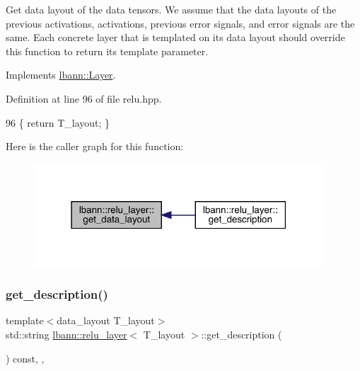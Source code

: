 Get data layout of the data tensors. We assume that the data layouts of the previous activations, activations, previous error signals, and error signals are the same. Each concrete layer that is templated on its data layout should override this function to return its template parameter. 

Implements \hyperlink{classlbann_1_1Layer_a5dfb66e81fc085997402a5e2241316bd}{lbann\+::\+Layer}.



Definition at line 96 of file relu.\+hpp.


\begin{DoxyCode}
96 \{ \textcolor{keywordflow}{return} T\_layout; \}
\end{DoxyCode}
Here is the caller graph for this function\+:\nopagebreak
\begin{figure}[H]
\begin{center}
\leavevmode
\includegraphics[width=307pt]{classlbann_1_1relu__layer_a1d0b9cb9fc976c2c4375d9422a1ac112_icgraph}
\end{center}
\end{figure}
\mbox{\label{classlbann_1_1relu__layer_a57d00fb2f9c90f5132ddea44d3ccc099}} 
\subsubsection{\texorpdfstring{get\+\_\+description()}{get\_description()}}
{\footnotesize\ttfamily template$<$data\+\_\+layout T\+\_\+layout$>$ \\
std\+::string \hyperlink{classlbann_1_1relu__layer}{lbann\+::relu\+\_\+layer}$<$ T\+\_\+layout $>$\+::get\+\_\+description (\begin{DoxyParamCaption}{ }\end{DoxyParamCaption}) const\hspace{0.3cm}{\ttfamily [inline]}, {\ttfamily [override]}, {\ttfamily [virtual]}}

